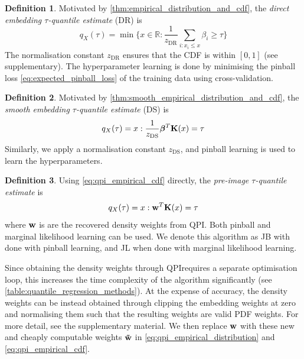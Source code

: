\documentclass[twoside]{article} \usepackage{aistats2017}
\theoremstyle{definition}
\newtheorem{definition}{Definition}[section]
\theoremstyle{theorem}
\newcommand{\rv}[1]{{#1}}
\newcommand{\qpi}{QPI}
\begin{document}
	\theoremstyle{definition}
	\begin{definition}
		Motivated by \cref{thm:empirical_distribution_and_cdf}, the \textit{direct embedding $\tau$-quantile estimate} (DR) is
		\begin{equation}
			q_{\rv{X}}(\tau) = \min\{x \in \mathbb{R} : \frac{1}{z_{\mathrm{DR}}} \sum_{i : x_{i} \leq x} \beta_{i} \geq \tau\}
		\end{equation}	
		The normalisation constant $z_{\mathrm{DR}}$ ensures that the CDF is within $[0, 1]$ (see supplementary). The hyperparameter learning is done by minimising the pinball loss \eqref{eq:expected_pinball_loss} of the training data using cross-validation.
	\end{definition}
	
	\theoremstyle{definition}
	\begin{definition}
		Motivated by \cref{thm:smooth_empirical_distribution_and_cdf}, the \textit{smooth embedding $\tau$-quantile estimate} (DS) is
		\begin{equation}
			q_{\rv{X}}(\tau) = x : \frac{1}{z_{\mathrm{DS}}} \bm{\beta}^{T} \bvec{K}(x) = \tau
		\end{equation}	
		Similarly, we apply a normalisation constant $z_{\mathrm{DS}}$, and pinball learning is used to learn the hyperparameters.
	\end{definition}
	
	\theoremstyle{definition}
	\begin{definition}
		Using \eqref{eq:qpi_empirical_cdf} directly, the \textit{pre-image $\tau$-quantile estimate} is
		\begin{equation}
			q_{\rv{X}}(\tau) = x : \bvec{w}^{T} \bvec{K}(x) = \tau
		\end{equation}	
		where $\mathbf{w}$ is are the recovered density weights from QPI.
		Both pinball and marginal likelihood learning can be used. We denote this algorithm as JB with done with pinball learning, and JL when done with marginal likelihood learning.
	\end{definition}
	
	Since obtaining the density weights through \qpi\space requires a separate optimisation loop, this increases the time complexity of the algorithm significantly (see \cref{table:quantile_regression_methods}). At the expense of accuracy, the density weights can be instead obtained through clipping the embedding weights at zero and normalising them such that the resulting weights are valid PDF weights. For more detail, see the supplementary material. We then replace $\mathbf{w}$ with these new and cheaply computable weights $\mathbf{\tilde{w}}$ in \eqref{eq:qpi_empirical_distribution} and \eqref{eq:qpi_empirical_cdf}.
%
%
\end{document}
